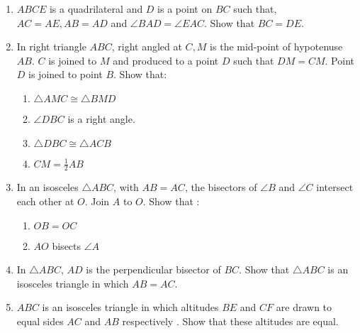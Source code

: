 \begin{enumerate}[label=\thesection.\arabic*.,ref=\thesection.\theenumi]
\item $ABCE$ is a quadrilateral and $D$ is a point on $BC$ such that, $AC = AE, AB = AD$ and $\angle  BAD = \angle  EAC$. Show that $BC = DE$.
%
\item In right triangle $ABC$, right angled at $C, M$ is the mid-point of hypotenuse $AB$. $C$ is joined to $M$ and produced to a point $D$ such that $DM = CM$. Point $D$ is joined to point $B$.
Show that: 
\begin{enumerate}
\item $ \triangle  AMC \cong  \triangle  BMD $
\item $\angle  DBC$ is a right angle. 
\item $\triangle  DBC \cong  \triangle  ACB$
\item $ CM = \frac{1}{ 2} AB$
\end{enumerate}
%
%
%

\item In an isosceles $\triangle ABC$, with $AB = AC$, the bisectors of $\angle B$ and $\angle C$ intersect each other at $O$. Join $A$ to $O$. Show that :
\begin{enumerate} 
\item $OB = OC$ 
\item $AO$ bisects $\angle A$
\end{enumerate}
\item In $\triangle ABC$, $AD$ is the perpendicular bisector of $BC$. Show that $\triangle ABC$ is an isosceles triangle in which $AB = AC$.
\item $ABC$ is an isosceles triangle in which altitudes $BE$ and $CF$ are drawn to equal sides $AC$ and $AB$ respectively . Show that these altitudes are equal.
%
\\
\solution



\end{enumerate}
